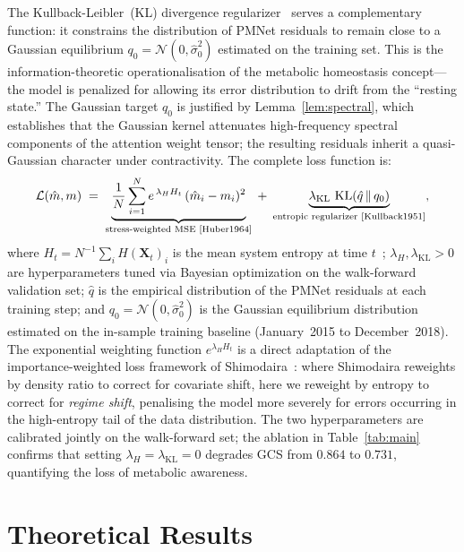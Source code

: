 \documentclass[11pt,a4paper]{article}  %
\DeclareMathOperator{\KL}{KL}
\theoremstyle{plain}
\theoremstyle{definition}
\theoremstyle{remark}
\begin{document}
The Kullback-Leibler~(KL) divergence regularizer~\cite{Kullback1951}
serves a complementary function: it constrains the distribution of
PMNet residuals to remain close to a Gaussian equilibrium
$q_0 = \mathcal{N}(0,\hat{\sigma}^2_0)$ estimated on the training
set. This is the information-theoretic operationalisation of the
metabolic homeostasis concept---the model is penalized for allowing
its error distribution to drift from the ``resting state.'' The
Gaussian target $q_0$ is justified by Lemma~\ref{lem:spectral},
which establishes that the Gaussian kernel attenuates high-frequency
spectral components of the attention weight tensor; the resulting
residuals inherit a quasi-Gaussian character under contractivity.
The complete loss function is:
\begin{equation}
   \mathcal{L}(\hat{m},m)
   \;=\; \underbrace{\frac{1}{N}\sum_{i=1}^{N}
   e^{\,\lambda_H H_t}\,(\hat{m}_i - m_i)^2}_{\text{stress-weighted MSE~\cite{Huber1964}}}
   \;+\; \underbrace{\lambda_{\mathrm{KL}}\,
   \KL\!\left(\hat{q}\,\|\,q_0\right)}_{\text{entropic regularizer~\cite{Kullback1951}}},
   \label{eq:loss}
\end{equation}
where $H_t = N^{-1}\sum_i H(\mathbf{X}_t)_i$ is the mean system
entropy at time $t$~\cite{Shannon1948}; $\lambda_H,\lambda_{\mathrm{KL}}>0$
are hyperparameters tuned via Bayesian optimization on the
walk-forward validation set; $\hat{q}$ is the empirical distribution
of the PMNet residuals at each training step; and
$q_0 = \mathcal{N}(0,\hat{\sigma}^2_0)$ is the Gaussian equilibrium
distribution estimated on the in-sample training baseline
(January~2015 to December~2018). The exponential weighting function
$e^{\lambda_H H_t}$ is a direct adaptation of the importance-weighted
loss framework of Shimodaira~\cite{Shimodaira2000}: where Shimodaira
reweights by density ratio to correct for covariate shift, here we
reweight by entropy to correct for \emph{regime shift}, penalising
the model more severely for errors occurring in the high-entropy
tail of the data distribution. The two hyperparameters are calibrated
jointly on the walk-forward set; the ablation in
Table~\ref{tab:main} confirms that setting $\lambda_H = \lambda_{\mathrm{KL}} = 0$
degrades GCS from $0.864$ to $0.731$, quantifying the loss of
metabolic awareness.

\section{Theoretical Results}
\label{sec:theory}
\end{document}

